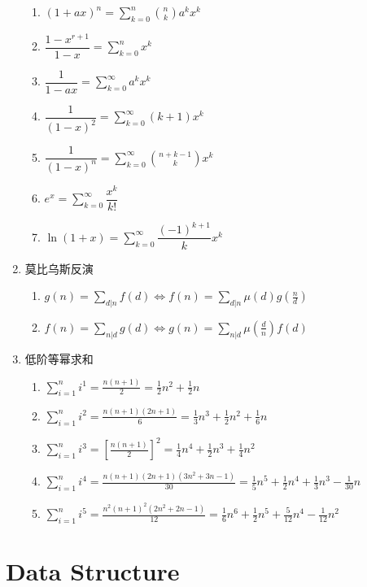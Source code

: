 \documentclass[twoside]{article}
\begin{document}
\begin{enumerate}
\begin{enumerate}
	\item $(1+ax)^n=\sum_{k=0}^n \binom {n}{k} a^kx^k$
	
	\item $\dfrac{1-x^{r+1}}{1-x}=\sum_{k=0}^nx^k$
	
	\item $\dfrac1{1-ax}=\sum_{k=0}^{\infty}a^kx^k$
	
	\item $\dfrac 1{(1-x)^2}=\sum_{k=0}^{\infty}(k+1)x^k$
	
	\item $\dfrac1{(1-x)^n}=\sum_{k=0}^{\infty} \binom{n+k-1}{k}x^k$
	
	\item $e^x=\sum_{k=0}^{\infty}\dfrac{x^k}{k!}$
	
	\item $\ln(1+x)=\sum_{k=0}^{\infty}\dfrac{(-1)^{k+1}}{k}x^k$

\end{enumerate}

\item 莫比乌斯反演

\begin{enumerate}
	
	\item $g(n) = \sum_{d|n} f(d) \Leftrightarrow f(n) = \sum_{d|n} \mu (d) g( \frac{n}{d})$
	
	\item $f(n)=\sum_{n|d}g(d) \Leftrightarrow g(n)=\sum_{n|d} \mu(\frac{d}{n}) f(d)$

\end{enumerate}

\item 低阶等幂求和

\begin{enumerate}
	
	\item $\sum_{i=1}^{n} i^{1} = \frac{n(n+1)}{2} = \frac{1}{2}n^2 +\frac{1}{2} n​$
	
	\item $\sum_{i=1}^{n} i^{2} = \frac{n(n+1)(2n+1)}{6} = \frac{1}{3}n^3 + \frac{1}{2}n^2 + \frac{1}{6}n$
	
	\item $\sum_{i=1}^{n} i^{3} = \left[\frac{n(n+1)}{2}\right]^{2} = \frac{1}{4}n^4 + \frac{1}{2}n^3 + \frac{1}{4}n^2$
	
	\item $\sum_{i=1}^{n} i^{4} = \frac{n(n+1)(2n+1)(3n^2+3n-1)}{30} = \frac{1}{5}n^5 + \frac{1}{2}n^4 + \frac{1}{3}n^3 - \frac{1}{30}n​$
	
	\item $\sum_{i=1}^{n} i^{5} = \frac{n^{2}(n+1)^{2}(2n^2+2n-1)}{12} = \frac{1}{6}n^6 + \frac{1}{2}n^5 + \frac{5}{12}n^4 - \frac{1}{12}n^2$
	
\end{enumerate}

\end{enumerate}\clearpage\section{Data Structure}
\end{document}
